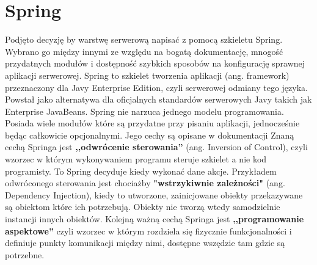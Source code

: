 \documentclass[a4paper,12pt,twoside,openany]{report}
\begin{document}
\chapter{Spring}
Podjęto decyzję by warstwę serwerową napisać z pomocą szkieletu Spring. Wybrano go między innymi ze względu na bogatą dokumentację, mnogość przydatnych modułów i dostępność szybkich sposobów na konfigurację sprawnej aplikacji serwerowej.
Spring to szkielet tworzenia aplikacji (ang. framework) przeznaczony dla Javy Enterprise Edition, czyli serwerowej odmiany tego języka. Powstał jako alternatywa dla oficjalnych standardów serwerowych Javy takich jak Enterprise JavaBeans. Spring nie narzuca jednego modelu programowania. Posiada wiele modułów które są przydatne przy pisaniu aplikacji, jednocześnie będąc całkowicie opcjonalnymi. Jego cechy są opisane w dokumentacji \cite{Spring3} Znaną cechą Springa jest \textbf{,,odwrócenie sterowania''} (ang. Inversion of Control), czyli wzorzec w którym wykonywaniem programu steruje szkielet a nie kod programisty. To Spring decyduje kiedy wykonać dane akcje. Przykładem odwróconego sterowania jest chociażby \textbf{"wstrzykiwnie zależności"} (ang. Dependency Injection), kiedy to utworzone, zainicjowane obiekty przekazywane są obiektom które ich potrzebują. Obiekty nie tworzą wtedy samodzielnie instancji innych obiektów. Kolejną ważną cechą Springa jest \textbf{,,programowanie aspektowe''} czyli wzorzec w którym rozdziela się fizycznie funkcjonalności i definiuje punkty komunikacji między nimi, dostępne wszędzie tam gdzie są potrzebne.
\end{document}
